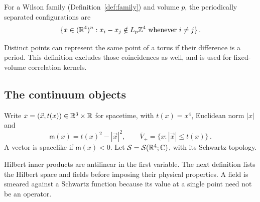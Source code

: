 \begin{definition}\label{def:periodic}
For a Wilson family (Definition~\ref{def:family}) and volume $p$, the periodically separated configurations are
\begin{equation}\label{eq:periodic-separated}
\{x\in(\mathbb R^4)^n:x_i-x_j\notin L_p\mathbb Z^4\text{ whenever }i\ne j\}\,.
\end{equation}
\end{definition}

Distinct points can represent the same point of a torus if their difference is a period.
This definition excludes those coincidences as well, and is used for fixed-volume correlation kernels.

\subsection{The continuum objects}\label{subsec:continuum-objects}

\begin{definition}\label{def:spacetime}
Write $x=(\vec x,t(x))\in\mathbb R^3\times\mathbb R$ for spacetime, with $t(x)=x^4$, Euclidean norm $|x|$ and
\begin{equation}\label{eq:spacetime}
\mathsf m(x)=t(x)^2-|\vec x|^2,
\qquad \overline V_+=\{x:|\vec x|\le t(x)\}\,.
\end{equation}
A vector is spacelike if $\mathsf m(x)<0$.
Let $\mathcal S=\mathcal S(\mathbb R^4;\mathbb C)$, with its Schwartz topology.
\end{definition}

Hilbert inner products are antilinear in the first variable.
The next definition lists the Hilbert space and fields before imposing their physical properties.
A field is smeared against a Schwartz function because its value at a single point need not be an operator.

